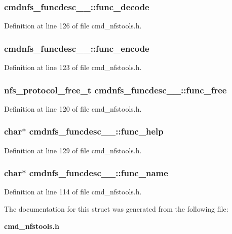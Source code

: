 \subsubsection[{func\_\-decode}]{ {\bf cmdnfs\_\-funcdesc\_\-\_\-::func\_\-decode}}\label{structcmdnfs__funcdesc_____a1091f2be96698004533edf49409089bf}


Definition at line 126 of file cmd\_\-nfstools.h.
\subsubsection[{func\_\-encode}]{ {\bf cmdnfs\_\-funcdesc\_\-\_\-::func\_\-encode}}\label{structcmdnfs__funcdesc_____ac3295b2ab9ae6c0047664185726426ae}


Definition at line 123 of file cmd\_\-nfstools.h.
\subsubsection[{func\_\-free}]{\setlength{\rightskip}{0pt plus 5cm}nfs\_\-protocol\_\-free\_\-t {\bf cmdnfs\_\-funcdesc\_\-\_\-::func\_\-free}}\label{structcmdnfs__funcdesc_____a91a56da2c915171050310576a86961ce}


Definition at line 120 of file cmd\_\-nfstools.h.
\subsubsection[{func\_\-help}]{\setlength{\rightskip}{0pt plus 5cm}char$\ast$ {\bf cmdnfs\_\-funcdesc\_\-\_\-::func\_\-help}}\label{structcmdnfs__funcdesc_____a69770d67708d4a228e5bbb0157b3392f}


Definition at line 129 of file cmd\_\-nfstools.h.
\subsubsection[{func\_\-name}]{\setlength{\rightskip}{0pt plus 5cm}char$\ast$ {\bf cmdnfs\_\-funcdesc\_\-\_\-::func\_\-name}}\label{structcmdnfs__funcdesc_____a743ef8af39998db9ac6567f7525ac3f2}


Definition at line 114 of file cmd\_\-nfstools.h.

The documentation for this struct was generated from the following file:\begin{DoxyCompactItemize}
\item 
{\bf cmd\_\-nfstools.h}\end{DoxyCompactItemize}
